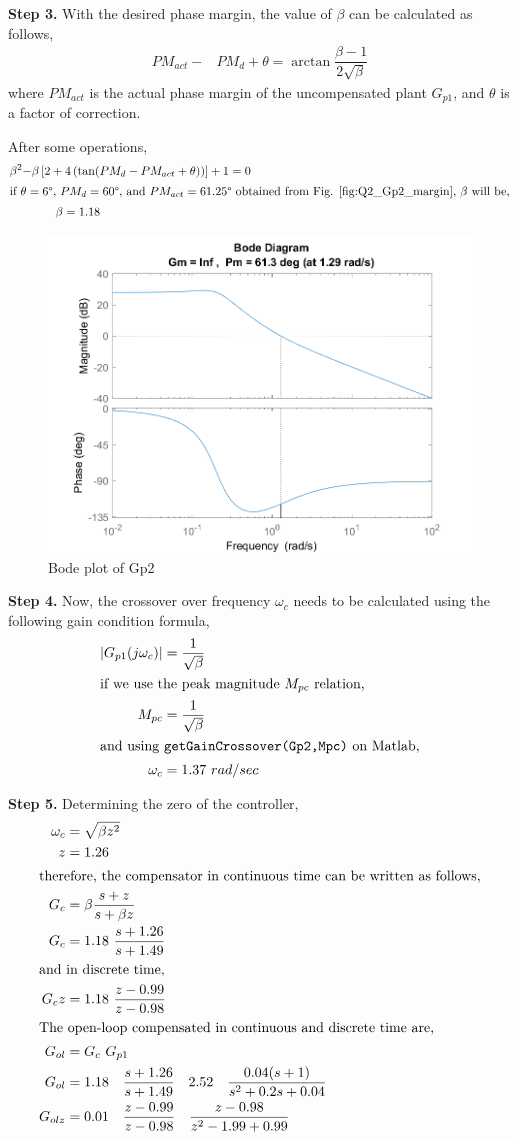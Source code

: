 \documentclass[11pt, a4paper]{article}
\begin{document}
\textbf{Step 3.} With the desired phase margin, the value of $\beta$ can be calculated as follows,
\begin{align}
PM_{act}- & PM_d+\theta = \arctan\dfrac{\beta-1}{2\sqrt{\beta}}
\end{align}
where $PM_{act}$ is the actual phase margin of the uncompensated plant $G_{p1}$, and $\theta$ is a factor of correction.

After some operations,
\begin{align}
\beta^2- & \beta\left[2+4\left(\tan(PM_d-PM_{act}+\theta)\right)\right] +1 = 0 \nonumber\\
\intertext{if $\theta=6\degree$, $PM_d=60\degree$, and $PM_{act}=61.25\degree$ obtained from Fig. \ref{fig:Q2_Gp2_margin}, $\beta$ will be,}
&\qquad \beta = 1.18 \nonumber
\end{align}

\begin{figure}[H]
	\centering
	\includegraphics[width=0.48\linewidth]{../Q1_Gp2_margin.png}
	\caption{Bode plot of Gp2}
	\label{fig:Q2_Gp2_margin}
\end{figure}


\textbf{Step 4.} Now, the  crossover over frequency $\omega_c$ needs to be calculated using the following gain condition formula,
\begin{align}
\left| G_{p1}(j\omega_c) \right| &= \dfrac{1}{\sqrt{\beta}} \\
\intertext{if we use the peak magnitude $M_{pc}$ relation,}
M_{pc} &= \dfrac{1}{\sqrt{\beta}} \\
\intertext{and using \texttt{getGainCrossover(Gp2,Mpc)} on Matlab,}
\omega_c& = 1.37 ~rad/sec \nonumber
\end{align}

\textbf{Step 5.} Determining the zero of the controller,
\begin{align}
\omega_c &= \sqrt{\beta z^2}\\
z &= 1.26 \nonumber\\
\intertext{therefore, the compensator in continuous time can be written as follows,}
G_c &= \beta\dfrac{s+z}{s+\beta z} \\
G_c &= 1.18~\dfrac{s+1.26}{s+1.49} \nonumber\\
\intertext{and in discrete time,}
G_cz &= 1.18~\dfrac{z-0.99}{z-0.98} \nonumber\\
\intertext{The open-loop compensated in continuous and discrete time are,}
G_{ol} &= G_c~ G_{p1}\\
G_{ol} &= 1.18\quad\dfrac{s+1.26}{s+1.49} \quad 2.52\quad\dfrac{0.04(s+1)}{s^2+0.2s+0.04} \\
G_{olz} &= 0.01\quad \dfrac{z-0.99}{z-0.98}\quad\dfrac{z-0.98}{z^2-1.99+0.99}
\end{align}
 
\end{document}
